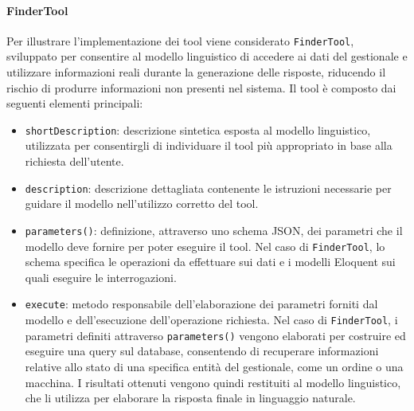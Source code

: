 \paragraph{FinderTool}
Per illustrare l'implementazione dei tool viene considerato \texttt{FinderTool}, sviluppato per consentire al modello linguistico di accedere ai dati del gestionale e 
utilizzare informazioni reali durante la generazione delle risposte, riducendo il rischio di produrre informazioni non presenti nel sistema.
\newline
Il tool è composto dai seguenti elementi principali:
\begin{itemize}
  \item \texttt{shortDescription}: descrizione sintetica esposta al modello linguistico, utilizzata per consentirgli di individuare il tool più appropriato in base alla 
    richiesta dell'utente.
  \item \texttt{description}: descrizione dettagliata contenente le istruzioni necessarie per guidare il modello nell'utilizzo corretto del tool.
  \item \texttt{parameters()}: definizione, attraverso uno schema JSON, dei parametri che il modello deve fornire per poter eseguire il tool. Nel caso di \texttt{FinderTool}, 
    lo schema specifica le operazioni da effettuare sui dati e i modelli Eloquent sui quali eseguire le interrogazioni.
  \item \texttt{execute}: metodo responsabile dell'elaborazione dei parametri forniti dal modello e dell'esecuzione dell'operazione richiesta. Nel caso di \texttt{FinderTool}, i 
    parametri definiti attraverso \texttt{parameters()} vengono elaborati per costruire ed eseguire una query sul database, consentendo di recuperare informazioni relative allo 
    stato di una specifica entità del gestionale, come un ordine o una macchina. I risultati ottenuti vengono quindi restituiti al modello linguistico, che li utilizza per 
    elaborare la risposta finale in linguaggio naturale.
\end{itemize}

